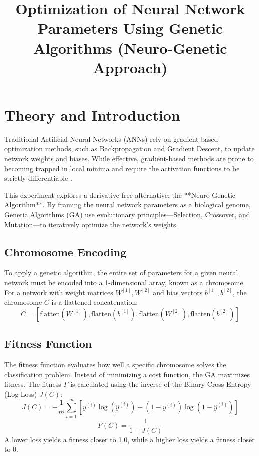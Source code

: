 \documentclass[11pt]{article}
\title{Optimization of Neural Network Parameters Using Genetic Algorithms (Neuro-Genetic Approach)}
\author{}
\date{}
\begin{document}


\pagebreak

\tableofcontents

\pagebreak
{}
\maketitle

\section{Theory and Introduction}
Traditional Artificial Neural Networks (ANNs) rely on gradient-based optimization methods, such as Backpropagation and Gradient Descent, to update network weights and biases. While effective, gradient-based methods are prone to becoming trapped in local minima and require the activation functions to be strictly differentiable \cite{goodfellow2016deep}.

This experiment explores a derivative-free alternative: the **Neuro-Genetic Algorithm**. By framing the neural network parameters as a biological genome, Genetic Algorithms (GA) use evolutionary principles—Selection, Crossover, and Mutation—to iteratively optimize the network's weights.

\subsection{Chromosome Encoding}
To apply a genetic algorithm, the entire set of parameters for a given neural network must be encoded into a 1-dimensional array, known as a chromosome. For a network with weight matrices $W^{[1]}, W^{[2]}$ and bias vectors $b^{[1]}, b^{[2]}$, the chromosome $C$ is a flattened concatenation:
\begin{equation}
    C = \left[ \text{flatten}(W^{[1]}), \text{flatten}(b^{[1]}), \text{flatten}(W^{[2]}), \text{flatten}(b^{[2]}) \right]
\end{equation}

\subsection{Fitness Function}
The fitness function evaluates how well a specific chromosome solves the classification problem. Instead of minimizing a cost function, the GA maximizes fitness. The fitness $F$ is calculated using the inverse of the Binary Cross-Entropy (Log Loss) $J(C)$:
\begin{equation}
    J(C) = -\frac{1}{m} \sum_{i=1}^{m} \left[ y^{(i)} \log(\hat{y}^{(i)}) + (1 - y^{(i)}) \log(1 - \hat{y}^{(i)}) \right]
\end{equation}
\begin{equation}
    F(C) = \frac{1}{1 + J(C)}
\end{equation}
A lower loss yields a fitness closer to 1.0, while a higher loss yields a fitness closer to 0.
\end{document}
